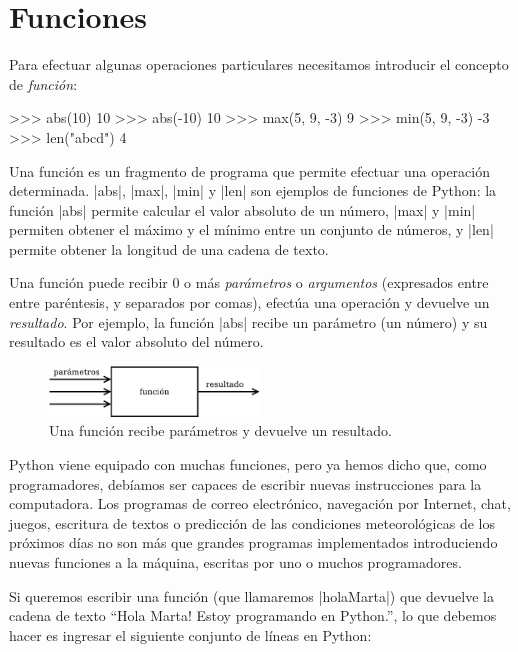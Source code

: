 \section{Funciones}

Para efectuar algunas operaciones particulares necesitamos introducir el
concepto de {\it función}:

\begin{codigo-python-sn}
>>> abs(10)
10
>>> abs(-10)
10
>>> max(5, 9, -3)
9
>>> min(5, 9, -3)
-3
>>> len("abcd")
4
\end{codigo-python-sn}

Una función es un fragmento de programa que permite efectuar una operación
determinada.  |abs|, |max|, |min| y |len| son ejemplos de funciones de Python:
la función |abs| permite calcular el valor absoluto de un número, |max| y |min|
permiten obtener el máximo y el mínimo entre un conjunto de números, y |len|
permite obtener la longitud de una cadena de texto.

Una función puede recibir 0 o más {\it parámetros} o {\it argumentos}
(expresados entre entre paréntesis, y separados por comas), efectúa una
operación y devuelve un {\it resultado}.  Por ejemplo, la función |abs| recibe
un parámetro (un número) y su resultado es el valor absoluto del número.

\begin{figure}[ht]
\caption{Una función recibe parámetros y devuelve un resultado.}
\begin{center}
\includegraphics[width=0.5\textwidth]{graficos/funcion}
\end{center}
\end{figure}

Python viene equipado con muchas funciones, pero ya hemos dicho que, como
programadores, debíamos ser capaces de escribir nuevas instrucciones para la
computadora. Los programas de correo electrónico, navegación por Internet,
chat, juegos, escritura de textos o predicción de las condiciones
meteorológicas de los próximos días no son más que grandes programas
implementados introduciendo nuevas funciones a la máquina, escritas por uno o
muchos programadores.

Si queremos escribir una función (que llamaremos |holaMarta|) que devuelve la
cadena de texto ``Hola Marta! Estoy programando en Python.'', lo que debemos
hacer es ingresar el siguiente conjunto de líneas en Python:

